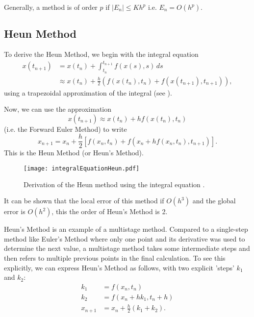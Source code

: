\begin{remark}
	Generally, a method is of order $p$ if $|E_n| \leq K h^p$ i.e. $E_n = O(h^p)$.
\end{remark}

\subsection{Heun Method}

To derive the Heun Method, we begin with the integral equation
\begin{align*}
	x(t_{n+1}) &= x(t_n) + \int_{t_n}^{t_{n+1}} f(x(s), s) \,ds \\
	&\approx x(t_n) + \frac{h}{2} (f(x(t_n), t_n) + f(x(t_{n+1}), t_{n+1})),
\end{align*}
using a trapezoidal approximation of the integral (see ).

Now, we can use the approximation
\[
x(t_{n+1}) \approx x(t_n) + h f(x(t_n), t_n)
\]
(i.e. the Forward Euler Method) to write
\begin{equation}
	x_{n+1} = x_n + \frac{h}{2}\left[f(x_n,t_n) + f(x_n + hf(x_n,t_n), t_{n+1})\right].
\end{equation}
This is the Heun Method (or Heun's Method).

\begin{figure}[!ht]
	\centering
	\texttt{[image: integralEquationHeun.pdf]}
	\caption{Derivation of the Heun method using the integral equation \cite[Figure 8.2.1]{boyce}.}
	\label{fig:heunint}
\end{figure}

\begin{remark}
	It can be shown that the local error of this method if $O(h^3)$ and the global error is $O(h^2)$, this the order of Heun's Method is 2.
\end{remark}

Heun's Method is an example of a multistage method. Compared to a single-step method like Euler's Method where only one point and its derivative was used to determine the next value, a multistage method takes some intermediate steps and then refers to multiple previous points in the final calculation. To see this explicitly, we can express Heun's Method as follows, with two explicit 'steps' $k_1$ and $k_2$:
\begin{align*}
	k_1 &= f(x_n, t_n) \\
	k_2 &= f(x_n + hk_1, t_n+h) \\
	x_{n+1} &= x_n + \frac{h}{2}(k_1 + k_2).
\end{align*}

